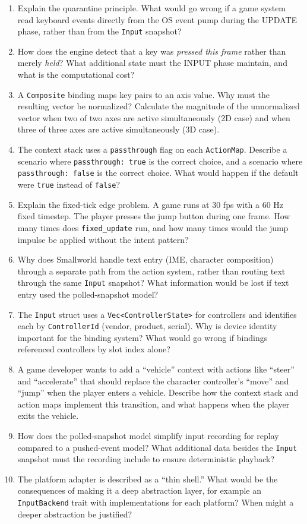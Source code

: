 \documentclass[
  11pt,
  letterpaper,
  DIV=11,
  numbers=noendperiod,
  twoside,
  open=right]{scrreprt}
\begin{document}
\begin{enumerate}
\def\labelenumi{\arabic{enumi}.}
\item
  Explain the quarantine principle. What would go wrong if a game system
  read keyboard events directly from the OS event pump during the UPDATE
  phase, rather than from the \texttt{Input} snapshot?
\item
  How does the engine detect that a key was \emph{pressed this frame}
  rather than merely \emph{held}? What additional state must the INPUT
  phase maintain, and what is the computational cost?
\item
  A \texttt{Composite} binding maps key pairs to an axis value. Why must
  the resulting vector be normalized? Calculate the magnitude of the
  unnormalized vector when two of two axes are active simultaneously (2D
  case) and when three of three axes are active simultaneously (3D
  case).
\item
  The context stack uses a \texttt{passthrough} flag on each
  \texttt{ActionMap}. Describe a scenario where
  \texttt{passthrough:\ true} is the correct choice, and a scenario
  where \texttt{passthrough:\ false} is the correct choice. What would
  happen if the default were \texttt{true} instead of \texttt{false}?
\item
  Explain the fixed-tick edge problem. A game runs at 30 fps with a 60
  Hz fixed timestep. The player presses the jump button during one
  frame. How many times does \texttt{fixed\_update} run, and how many
  times would the jump impulse be applied without the intent pattern?
\item
  Why does Smallworld handle text entry (IME, character composition)
  through a separate path from the action system, rather than routing
  text through the same \texttt{Input} snapshot? What information would
  be lost if text entry used the polled-snapshot model?
\item
  The \texttt{Input} struct uses a
  \texttt{Vec\textless{}ControllerState\textgreater{}} for controllers
  and identifies each by \texttt{ControllerId} (vendor, product,
  serial). Why is device identity important for the binding system? What
  would go wrong if bindings referenced controllers by slot index alone?
\item
  A game developer wants to add a ``vehicle'' context with actions like
  ``steer'' and ``accelerate'' that should replace the character
  controller's ``move'' and ``jump'' when the player enters a vehicle.
  Describe how the context stack and action maps implement this
  transition, and what happens when the player exits the vehicle.
\item
  How does the polled-snapshot model simplify input recording for replay
  compared to a pushed-event model? What additional data besides the
  \texttt{Input} snapshot must the recording include to ensure
  deterministic playback?
\item
  The platform adapter is described as a ``thin shell.'' What would be
  the consequences of making it a deep abstraction layer, for example an
  \texttt{InputBackend} trait with implementations for each platform?
  When might a deeper abstraction be justified?
\end{enumerate}
\end{document}
